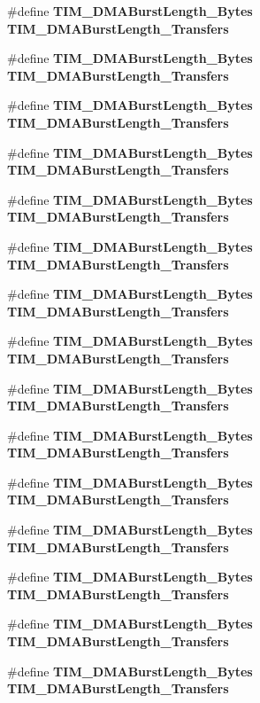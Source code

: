 \begin{DoxyCompactItemize}
\item 
\#define \textbf{ T\+I\+M\+\_\+\+D\+M\+A\+Burst\+Length\+\_\+Bytes}~\textbf{ T\+I\+M\+\_\+\+D\+M\+A\+Burst\+Length\+\_\+Transfers}
\item 
\#define \textbf{ T\+I\+M\+\_\+\+D\+M\+A\+Burst\+Length\+\_\+Bytes}~\textbf{ T\+I\+M\+\_\+\+D\+M\+A\+Burst\+Length\+\_\+Transfers}
\item 
\#define \textbf{ T\+I\+M\+\_\+\+D\+M\+A\+Burst\+Length\+\_\+Bytes}~\textbf{ T\+I\+M\+\_\+\+D\+M\+A\+Burst\+Length\+\_\+Transfers}
\item 
\#define \textbf{ T\+I\+M\+\_\+\+D\+M\+A\+Burst\+Length\+\_\+Bytes}~\textbf{ T\+I\+M\+\_\+\+D\+M\+A\+Burst\+Length\+\_\+Transfers}
\item 
\#define \textbf{ T\+I\+M\+\_\+\+D\+M\+A\+Burst\+Length\+\_\+Bytes}~\textbf{ T\+I\+M\+\_\+\+D\+M\+A\+Burst\+Length\+\_\+Transfers}
\item 
\#define \textbf{ T\+I\+M\+\_\+\+D\+M\+A\+Burst\+Length\+\_\+Bytes}~\textbf{ T\+I\+M\+\_\+\+D\+M\+A\+Burst\+Length\+\_\+Transfers}
\item 
\#define \textbf{ T\+I\+M\+\_\+\+D\+M\+A\+Burst\+Length\+\_\+Bytes}~\textbf{ T\+I\+M\+\_\+\+D\+M\+A\+Burst\+Length\+\_\+Transfers}
\item 
\#define \textbf{ T\+I\+M\+\_\+\+D\+M\+A\+Burst\+Length\+\_\+Bytes}~\textbf{ T\+I\+M\+\_\+\+D\+M\+A\+Burst\+Length\+\_\+Transfers}
\item 
\#define \textbf{ T\+I\+M\+\_\+\+D\+M\+A\+Burst\+Length\+\_\+Bytes}~\textbf{ T\+I\+M\+\_\+\+D\+M\+A\+Burst\+Length\+\_\+Transfers}
\item 
\#define \textbf{ T\+I\+M\+\_\+\+D\+M\+A\+Burst\+Length\+\_\+Bytes}~\textbf{ T\+I\+M\+\_\+\+D\+M\+A\+Burst\+Length\+\_\+Transfers}
\item 
\#define \textbf{ T\+I\+M\+\_\+\+D\+M\+A\+Burst\+Length\+\_\+Bytes}~\textbf{ T\+I\+M\+\_\+\+D\+M\+A\+Burst\+Length\+\_\+Transfers}
\item 
\#define \textbf{ T\+I\+M\+\_\+\+D\+M\+A\+Burst\+Length\+\_\+Bytes}~\textbf{ T\+I\+M\+\_\+\+D\+M\+A\+Burst\+Length\+\_\+Transfers}
\item 
\#define \textbf{ T\+I\+M\+\_\+\+D\+M\+A\+Burst\+Length\+\_\+Bytes}~\textbf{ T\+I\+M\+\_\+\+D\+M\+A\+Burst\+Length\+\_\+Transfers}
\item 
\#define \textbf{ T\+I\+M\+\_\+\+D\+M\+A\+Burst\+Length\+\_\+Bytes}~\textbf{ T\+I\+M\+\_\+\+D\+M\+A\+Burst\+Length\+\_\+Transfers}
\item 
\#define \textbf{ T\+I\+M\+\_\+\+D\+M\+A\+Burst\+Length\+\_\+Bytes}~\textbf{ T\+I\+M\+\_\+\+D\+M\+A\+Burst\+Length\+\_\+Transfers}
\end{DoxyCompactItemize}
